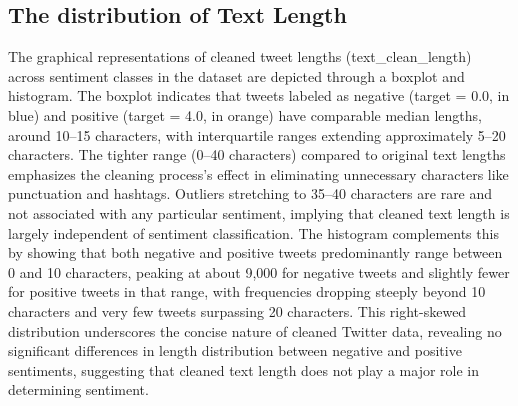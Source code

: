 \subsection{The distribution of Text Length}

The graphical representations of cleaned tweet lengths (text\_clean\_length) across sentiment classes in the dataset are depicted through a boxplot and histogram. The boxplot indicates that tweets labeled as negative (target = 0.0, in blue) and positive (target = 4.0, in orange) have comparable median lengths, around 10–15 characters, with interquartile ranges extending approximately 5–20 characters. The tighter range (0–40 characters) compared to original text lengths emphasizes the cleaning process’s effect in eliminating unnecessary characters like punctuation and hashtags. Outliers stretching to 35–40 characters are rare and not associated with any particular sentiment, implying that cleaned text length is largely independent of sentiment classification. The histogram complements this by showing that both negative and positive tweets predominantly range between 0 and 10 characters, peaking at about 9,000 for negative tweets and slightly fewer for positive tweets in that range, with frequencies dropping steeply beyond 10 characters and very few tweets surpassing 20 characters. This right-skewed distribution underscores the concise nature of cleaned Twitter data, revealing no significant differences in length distribution between negative and positive sentiments, suggesting that cleaned text length does not play a major role in determining sentiment.

